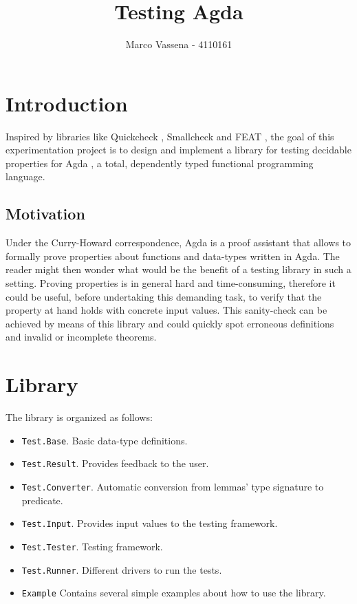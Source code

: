 \documentclass[10pt,a4paper]{article}
\author{Marco Vassena - 4110161}
\title{Testing Agda}
\begin{document}
\maketitle

\section{Introduction}
Inspired by libraries like Quickcheck \cite{QUICK}, Smallcheck \cite{SMALL} and FEAT \cite{FEAT}, the goal of this experimentation project is to design and implement a library for testing decidable properties for Agda \cite{AGDA}, a total, dependently typed functional programming language.

\subsection{Motivation}
Under the Curry-Howard correspondence, Agda is a proof assistant that allows to formally prove properties about functions and data-types written in Agda. The reader might then wonder what would be the benefit of a testing library in such a setting. Proving properties is in general hard and time-consuming, therefore it could be useful, before undertaking this demanding task, to verify that the property at hand holds with concrete input values. This sanity-check can be achieved by means of this library and could quickly spot erroneous definitions and invalid or incomplete theorems.

\section{Library}
The library is organized as follows:
\begin{itemize}
	\item \texttt{Test.Base}. Basic data-type definitions.
	\item \texttt{Test.Result}. Provides feedback to the user.
	\item \texttt{Test.Converter}. Automatic conversion from lemmas' type signature to predicate.
	\item \texttt{Test.Input}. Provides input values to the testing framework.
	\item \texttt{Test.Tester}. Testing framework.
	\item \texttt{Test.Runner}. Different drivers to run the tests.
	\item \texttt{Example} Contains several simple examples about how to use the library.
\end{itemize}
\end{document}
